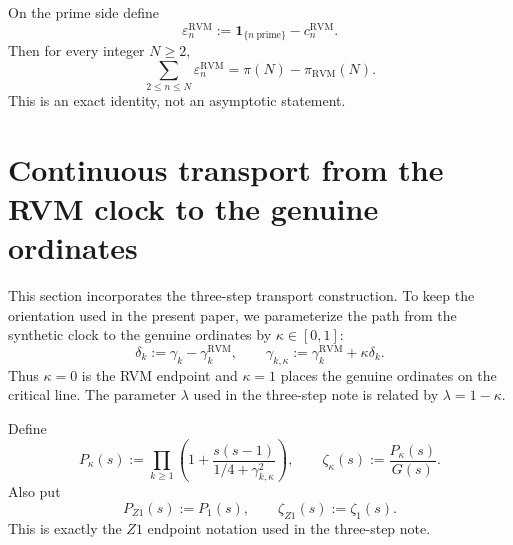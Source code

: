 \documentclass[11pt,reqno]{amsart}
\theoremstyle{definition}
\theoremstyle{remark}
\newcommand{\eps}{\varepsilon}
\newcommand{\RVM}{\mathrm{RVM}}
\begin{document}
On the prime side define
\begin{equation}\label{eq:prime-defect}
 \eps_n^{\RVM}
 :=\mathbf 1_{\{n\ \mathrm{prime}\}}-c_n^{\RVM}.
\end{equation}
Then for every integer $N\ge2$,
\begin{equation}\label{eq:prime-defect-cumulative}
 \boxed{
 \sum_{2\le n\le N}\eps_n^{\RVM}
 =\pi(N)-\pi_{\RVM}(N).}
\end{equation}
This is an exact identity, not an asymptotic statement.

\section{Continuous transport from the RVM clock to the genuine ordinates}

This section incorporates the three-step transport construction.  To keep the orientation used in the present paper, we parameterize the path from the synthetic clock to the genuine ordinates by $\kappa\in[0,1]$:
\begin{equation}\label{eq:transport-delta}
 \delta_k:=\gamma_k-\gamma_k^{\RVM},
 \qquad
 \gamma_{k,\kappa}
 :=\gamma_k^{\RVM}+\kappa\delta_k.
\end{equation}
Thus $\kappa=0$ is the RVM endpoint and $\kappa=1$ places the genuine ordinates on the critical line.  The parameter $\lambda$ used in the three-step note is related by $\lambda=1-\kappa$.

Define
\begin{equation}\label{eq:path-product}
 P_\kappa(s)
 :=\prod_{k\ge1}
 \left(1+\frac{s(s-1)}{1/4+\gamma_{k,\kappa}^2}\right),
 \qquad
 \zeta_\kappa(s):=\frac{P_\kappa(s)}{G(s)}.
\end{equation}
Also put
\begin{equation}\label{eq:PZ1}
 P_{Z1}(s):=P_1(s),
 \qquad
 \zeta_{Z1}(s):=\zeta_1(s).
\end{equation}
This is exactly the $Z1$ endpoint notation used in the three-step note.
\end{document}
